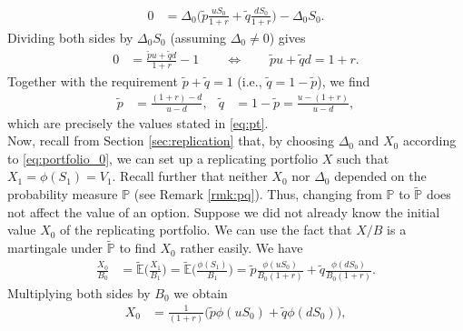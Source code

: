 \documentclass[12pt]{book}
\numberwithin{equation}{chapter}
\theoremstyle{plain}
\numberwithin{theorem}{section}
\theoremstyle{definition}
\numberwithin{exercise}{chapter}
\newcommand{\<}{\langle}
\renewcommand{\>}{\rangle}
\renewcommand{\(}{\left(}
\renewcommand{\)}{\right)}
\renewcommand{\[}{\left[}
\renewcommand{\]}{\right]}
\newcommand\Eb{\mathds{E}}
\newcommand\Pb{\mathds{P}}
\newcommand\Del{\Delta}
\newcommand\Ebt{\widetilde{\Eb}}
\newcommand\Pbt{\widetilde{\Pb}}
\newcommand\qt{\widetilde{q}}
\theoremstyle{definition}
\numberwithin{question}{section}
\newcommand\pt{\widetilde{p}}
\begin{document}
\begin{align}
0
	&=	\Del_0 \Big( \pt \frac{u S_0}{1+r} + \qt \frac{d S_0}{1+r} \Big) - \Del_0 S_0 .
\end{align}
Dividing both sides by $\Del_0 S_0$ (assuming $\Del_0 \neq 0$) gives
\begin{align}
0
	&=	\frac{\pt u + \qt d}{1+r} - 1
	\qquad \Longleftrightarrow \qquad
\pt u + \qt d
	=	1+r .
\end{align}
Together with the requirement $\pt + \qt = 1$ (i.e., $\qt = 1-\pt$), we find
\begin{align}
\pt
	&=	\frac{(1+r)-d}{u-d} , &
\qt
	&=	1-\pt
	=	\frac{u-(1+r)}{u-d} ,
\end{align}
which are precisely the values stated in \eqref{eq:pt}.
\\[0.5em]
Now, recall from Section \ref{sec:replication} that, by choosing $\Del_0$ and $X_0$ according to \eqref{eq:portfolio_0}, we can set up a replicating portfolio $X$ such that $X_1 = \phi(S_1) = V_1$.  Recall further that neither $X_0$ nor $\Del_0$ depended on the probability measure $\Pb$ (see Remark \ref{rmk:pq}).  Thus, changing from $\Pb$ to $\Pbt$ does not affect the value of an option.  Suppose we did not already know the initial value $X_0$ of the replicating portfolio.  We can use the fact that $X/B$ is a martingale under $\Pbt$ to find $X_0$ rather easily.  We have
\begin{align}
\frac{X_0}{B_0}
	&=	\Ebt \Big( \frac{X_1}{B_1} \Big)
	=		\Ebt \Big( \frac{\phi(S_1)}{B_1} \Big)
	 =	\pt \frac{\phi(u S_0)}{B_0 (1+r)} + \qt \frac{\phi(d S_0)}{B_0 (1+r)} .
\end{align}
Multiplying both sides by $B_0$ we obtain
\begin{align}
X_0 
	&= \frac{1}{(1+r)} \Big( \pt \phi (u S_0) + \qt \phi (d S_0) \Big), 
\end{align}
\end{document}
